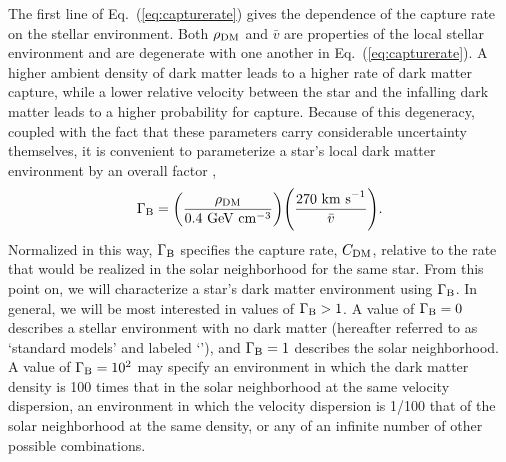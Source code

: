 \documentclass[useAMS,usenatbib]{mnras}
\begin{document}
  The first line of Eq.~(\ref{eq:capturerate}) gives 
  the dependence of the capture rate on the stellar environment. 
  Both $\rho_{\mathrm{DM}}$ and $\bar{v}$ are properties of the local stellar environment 
  and are degenerate with one another in Eq.~(\ref{eq:capturerate}). 
  A higher ambient density of dark matter leads to a higher rate of dark matter capture, 
  while a lower relative velocity between the star and the infalling dark matter leads 
  to a higher probability for capture. 
  Because of this degeneracy, coupled with the fact that these parameters carry 
  considerable uncertainty themselves, 
  it is convenient to parameterize a star's 
  local dark matter environment by an overall 
  factor \citep{Zentner2011AsymmetricDwarfs,Hurst2015},
%
  \begin{equation}
  \Gamma_\mathrm{B} = \bigg(\frac{\rho_{\mathrm{DM}}}{0.4 \ \mathrm{GeV} \ \mathrm{cm}^{-3}}\bigg) \Bigg(\frac{270 \ \mathrm{km\ s}^{-1}}{\bar{v}}\Bigg).
  \label{eq:gammab}
  \end{equation}
%
Normalized in this way, $\Gamma_\mathrm{B}$ specifies the capture rate, 
$C_{\mathrm{DM}}$, relative to the rate that would be realized in the 
solar neighborhood for the same star. 
From this point on, 
we will characterize a star's dark matter environment using 
$\Gamma_\mathrm{B}$. In general, we will be most interested in values of $\Gamma_\mathrm{B} > 1$. 
A value of $\Gamma_\mathrm{B} = 0$ describes a stellar environment with no dark matter 
(hereafter referred to as `standard models' and labeled `\nodm'), 
and $\Gamma_\mathrm{B} = 1$ describes the solar neighborhood. 
A value of $\Gamma_\mathrm{B} = 10^{2}$ may specify an environment in 
which the dark matter density is 100 times that in the 
solar neighborhood at the same velocity dispersion, 
an environment in which the velocity dispersion is 1/100 that 
of the solar neighborhood at the same density, 
or any of an infinite number of other possible combinations. 
\end{document}
